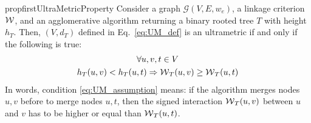 


\begin{restatable}{prop}{firstUltraMetricProperty}
\label{prop:ultraMetric1}
Consider a graph $\mathcal{G}(V,E,w_e)$, a linkage criterion $\mathcal{W}{}$, and an agglomerative algorithm returning a binary rooted tree $T$ with height $h_T$. Then, $(V, d_{T})$ defined in Eq.~\ref{eq:UM_def} is an ultrametric if and only if the following is true:
\begin{gather}
\forall u,v,t \in V \nonumber \\
 h_T(u, v) < h_T(u, t) \Rightarrow \mathcal{W}{}_{T}(u,v) \geq \mathcal{W}{}_{T}(u,t) \label{eq:UM_assumption}
\end{gather}
In words, condition \ref{eq:UM_assumption} means: if the algorithm merges nodes $u,v$ before to merge nodes $u,t$, then the signed interaction $\mathcal{W}{}_{T}(u,v)$ between $u$ and $v$ has to be higher or equal than $\mathcal{W}{}_{T}(u,t)$.
\end{restatable}
